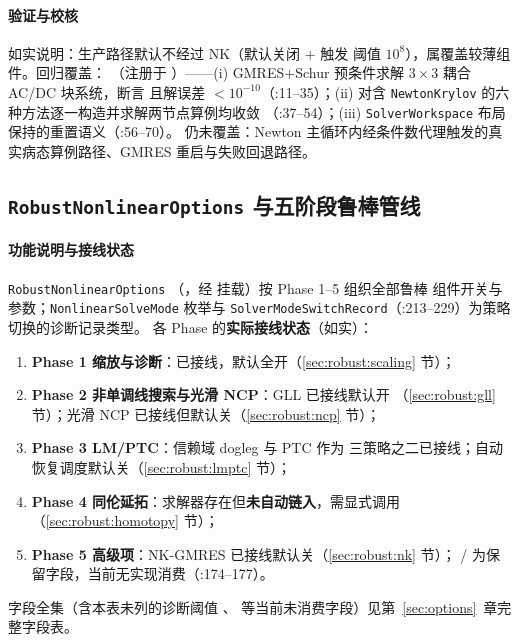 \paragraph{验证与校核} 如实说明：生产路径默认不经过 NK（默认关闭 + 触发
阈值 $10^{8}$），属覆盖较薄组件。回归覆盖：
（注册于
）——(i) GMRES$+$Schur 预条件求解
$3\times3$ 耦合 AC/DC 块系统，断言  且解误差
$<10^{-10}$（:11--35）；(ii)  对含
\texttt{NewtonKrylov} 的六种方法逐一构造并求解两节点算例均收敛
（:37--54）；(iii) \texttt{SolverWorkspace} 布局保持的重置语义（:56--70）。
仍未覆盖：Newton 主循环内经条件数代理触发的真实病态算例路径、GMRES
重启与失败回退路径。

\subsection{\texttt{RobustNonlinearOptions} 与五阶段鲁棒管线}\label{sec:robust:pipeline}

\paragraph{功能说明与接线状态} \texttt{RobustNonlinearOptions}
（，经
 挂载）按 Phase 1--5 组织全部鲁棒
组件开关与参数；\texttt{NonlinearSolveMode} 枚举与
\texttt{SolverModeSwitchRecord}（:213--229）为策略切换的诊断记录类型。
各 Phase 的\textbf{实际接线状态}（如实）：
\begin{enumerate}
  \item \textbf{Phase 1 缩放与诊断}：已接线，默认全开（\ref{sec:robust:scaling} 节）；
  \item \textbf{Phase 2 非单调线搜索与光滑 NCP}：GLL 已接线默认开
        （\ref{sec:robust:gll} 节）；光滑 NCP 已接线但默认关（\ref{sec:robust:ncp} 节）；
  \item \textbf{Phase 3 LM/PTC}：信赖域 dogleg 与 PTC 作为 
        三策略之二已接线；自动恢复调度默认关（\ref{sec:robust:lmptc} 节）；
  \item \textbf{Phase 4 同伦延拓}：求解器存在但\textbf{未自动链入}，需显式调用
        （\ref{sec:robust:homotopy} 节）；
  \item \textbf{Phase 5 高级项}：NK-GMRES 已接线默认关（\ref{sec:robust:nk} 节）；
        /
        为保留字段，当前无实现消费（:174--177）。
\end{enumerate}
字段全集（含本表未列的诊断阈值 、
 等当前未消费字段）见第~\ref{sec:options}~章完整字段表。
